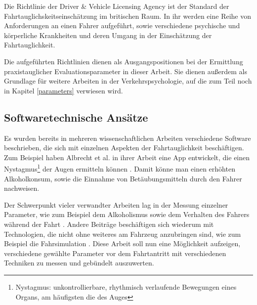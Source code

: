 Die Richtlinie der Driver \& Vehicle Licensing Agency \cite{drivervehiclelicencingagency} ist der Standard der Fahrtauglichskeitseinschätzung im britischen Raum. In ihr werden eine Reihe von Anforderungen an einen Fahrer aufgeführt, sowie verschiedene psychische und körperliche Krankheiten und deren Umgang in der Einschätzung der Fahrtauglichkeit.

Die aufgeführten Richtlinien dienen als Ausgangspositionen bei der Ermittlung praxistauglicher Evaluationsparameter in dieser Arbeit. Sie dienen außerdem als Grundlage für weitere Arbeiten in der Verkehrspsychologie, auf die zum Teil noch in Kapitel \ref{parameters} verwiesen wird.

\subsection{Softwaretechnische Ansätze}

Es wurden bereits in mehreren wissenschaftlichen Arbeiten verschiedene Software beschrieben, die sich mit einzelnen Aspekten der Fahrtauglichkeit beschäftigen. Zum Beispiel haben Albrecht et al. in ihrer Arbeit eine App entwickelt, die einen Nystagmus\footnote{\label{foot:nystagmus} Nystagmus: unkontrollierbare, rhythmisch verlaufende Bewegungen eines Organs, am häufigsten die des Auges}  der Augen ermitteln können \cite{mobilesmarttracking}. Damit könne man einen erhöhten Alkoholkonsum, sowie die Einnahme von Betäubungsmitteln durch den Fahrer nachweisen.


Der Schwerpunkt vieler verwandter Arbeiten lag in der Messung einzelner Parameter, wie zum Beispiel dem Alkoholismus \cite{mobilesmarttracking,sobrietymobiletests} sowie dem Verhalten des Fahrers während der Fahrt \cite{texive, drivesafe, healthylifeactivityrecognition}. Andere Beiträge beschäftigen sich wiederum mit Technologien, die nicht ohne weiteres am Fahrzeug anzubringen sind, wie zum Beispiel die Fahrsimulation \cite{drivingsimulations, interaktivefahrsimulation}.  Diese Arbeit soll nun eine Möglichkeit aufzeigen, verschiedene gewählte Parameter vor dem Fahrtantritt mit verschiedenen Techniken zu messen und gebündelt auszuwerten.